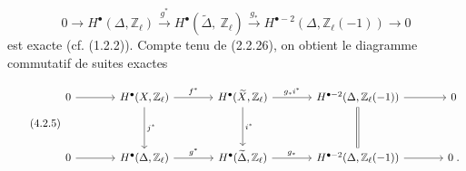 \begin{equation}\tag{4.2.4}
0 \longrightarrow H^{\bullet}(\Delta,\mathbb{Z}_{\ell}) \stackrel{g^{*}}{\longrightarrow} H^{\bullet}(\widetilde{\Delta},\ \mathbb{Z}_{\ell}) \stackrel{g_{*}}{\longrightarrow} H^{\bullet-2}(\Delta,\mathbb{Z}_{\ell}(-1)) \longrightarrow 0
\end{equation}
est exacte (cf. (1.2.2)). Compte tenu de (2.2.26), on obtient le diagramme commutatif  de suites exactes

\begin{equation}\tag{4.2.5}
\begin{tikzcd}[column sep=large, row sep=huge]
0 \arrow[r] & H^{\bullet}(X,\mathbb{Z}_{\ell}) \arrow[r, "f^{*}"] \arrow[d, "j^{*}"] & H^{\bullet}(\widetilde{X},\mathbb{Z}_{\ell}) \arrow[r, "g_{*}i^{*}"] \arrow[d, "i^{*}"] & H^{\bullet-2}(\Delta,\mathbb{Z}_{\ell}(-1)) \arrow[r] \arrow[d, Rightarrow, no head] & 0 \\
0 \arrow[r] & H^{\bullet}(\Delta,\mathbb{Z}_{\ell}) \arrow[r, "g^{*}"] & H^{\bullet}(\widetilde{\Delta},\mathbb{Z}_{\ell}) \arrow[r, "g_{*}"] & H^{\bullet-2}(\Delta,\mathbb{Z}_{\ell}(-1)) \arrow[r] & 0\;.
\end{tikzcd}
\end{equation}

